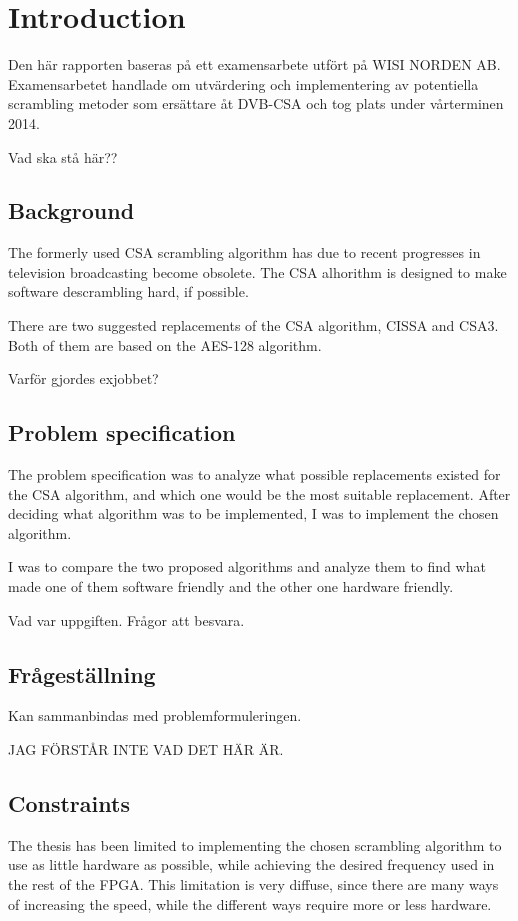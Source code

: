 \chapter{Introduction}
Den här rapporten baseras på ett examensarbete utfört på WISI NORDEN 
AB. Examensarbetet handlade om utvärdering och implementering av 
potentiella scrambling metoder som ersättare åt DVB-CSA och tog plats 
under vårterminen 2014.

Vad ska stå här??

\section{Background}
The formerly used CSA scrambling algorithm has due to recent 
progresses in television broadcasting become obsolete. The CSA 
alhorithm is designed to make software descrambling hard, if possible.

There are two suggested replacements of the CSA algorithm, CISSA and 
CSA3. Both of them are based on the AES-128 algorithm. 

Varför gjordes exjobbet?


\section{Problem specification}
The problem specification was to analyze what possible replacements 
existed for the CSA algorithm, and which one would be the most suitable 
replacement. 
After deciding what algorithm was to be implemented, I was to implement 
the chosen algorithm.

I was to compare the two proposed algorithms and analyze them to find 
what made one of them software friendly and the other one hardware 
friendly.

Vad var uppgiften. Frågor att besvara.


\section{Frågeställning}
Kan sammanbindas med problemformuleringen.

JAG FÖRSTÅR INTE VAD DET HÄR ÄR.

\section{Constraints}
The thesis has been limited to implementing the chosen scrambling 
algorithm to use as little hardware as possible, while achieving 
the desired frequency used in the rest of the FPGA. This limitation 
is very diffuse, since there are many ways of increasing the speed, 
while the different ways require more or less hardware.

